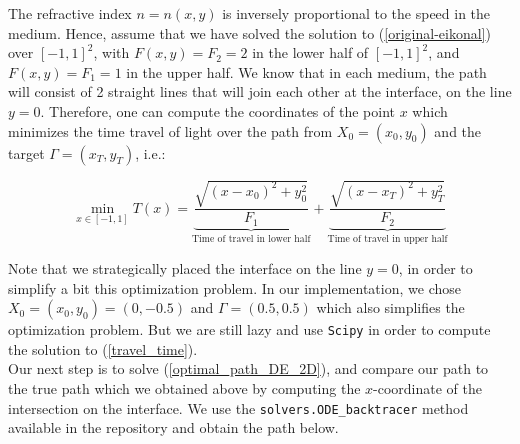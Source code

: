 \documentclass[11pt]{article}
\theoremstyle{definition}
\theoremstyle{remark}
\begin{document}
\begin{center}
\end{center}

\noindent The refractive index $n=n(x,y)$ is inversely proportional to the speed in the medium. Hence, assume that we have solved the solution to (\ref{original-eikonal}) over $[-1,1]^2$, with $F(x,y)=F_2 =2$ in the lower half of $[-1,1]^2$, and $F(x,y)=F_1 = 1$ in the upper half. We know that in each medium, the path will consist of 2 straight lines that will join each other at the interface, on the line $y=0$. Therefore, one can compute the coordinates of the point $x$ which minimizes the time travel of light over the path from $X_0=(x_0,y_0)$ and the target $\Gamma=(x_T,y_T)$, i.e.:

\begin{equation}
\label{travel_time}
    \min_{x\in[-1,1]}T(x)=\underbrace{\frac{\sqrt{(x-x_0)^2+y_0^2}}{F_1}}_{\text{Time of travel in lower half}}+\underbrace{\frac{\sqrt{(x-x_T)^2+y_T^2}}{F_2}}_{\text{Time of travel in upper half}}
\end{equation}

\noindent Note that we strategically placed the interface on the line $y=0$, in order to simplify a bit this optimization problem. In our implementation, we chose $X_0=(x_0,y_0)=(0,-0.5)$ and $\Gamma =(0.5,0.5)$ which also simplifies the optimization problem. But we are still lazy and use \texttt{Scipy} in order to compute the solution to (\ref{travel_time}). \\
\noindent Our next step is to solve (\ref{optimal_path_DE_2D}), and compare our path to the true path which we obtained above by computing the $x$-coordinate of the intersection on the interface. We use the \texttt{solvers.ODE\_backtracer} method available in the repository and obtain the path below.
\end{document}
